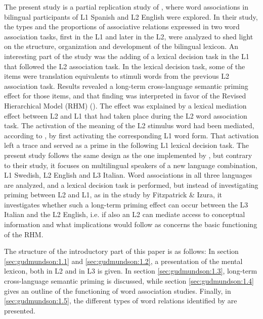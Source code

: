 \documentclass[output=paper,colorlinks,citecolor=brown,nonflat]{langsci/langscibook}
\begin{document}
The present study is a partial replication study of \citet{FitzpatrickIzura2011}, where word associations in bilingual participants of L1 Spanish and L2 English were explored. In their study, the types and the proportions of associative relations expressed in two word association tasks, first in the L1 and later in the L2, were analyzed to shed light on the structure, organization and development of the bilingual lexicon. An interesting part of the \citeauthor{FitzpatrickIzura2011} study was the adding of a lexical decision task in the L1 that followed the L2 association task. In the lexical decision task, some of the items were translation equivalents to stimuli words from the previous L2 association task. Results revealed a long-term cross-language semantic priming effect for those items, and that finding was interpreted in favor of the Revised Hierarchical Model (RHM) (\citealt{KrollStewart1994}). The effect was explained by a lexical mediation effect between L2 and L1 that had taken place during the L2 word association task. The activation of the meaning of the L2 stimulus word had been mediated, according to \citeauthor{FitzpatrickIzura2011}, by first activating the corresponding L1 word form. That activation left a trace and served as a prime in the following L1 lexical decision task. The present study follows the same design as the one implemented by \citet{FitzpatrickIzura2011}, but contrary to their study, it focuses on multilingual speakers of a new language combination, L1 Swedish, L2 English and L3 Italian. Word associations in all three languages are analyzed, and a lexical decision task is performed, but instead of investigating priming between L2 and L1, as in the study by Fitzpatrick \& Izura, it investigates whether such a long-term priming effect can occur between the L3 Italian and the L2 English, i.e. if also an L2 can mediate access to conceptual information and what implications would follow as concerns the basic functioning of the RHM.

The structure of the introductory part of this paper is as follows: In section \ref{sec:gudmundson:1.1} and \ref{sec:gudmundson:1.2}, a presentation of the mental lexicon, both in L2 and in L3 is given. In section \ref{sec:gudmundson:1.3}, long-term cross-language semantic priming is discussed, while section \ref{sec:gudmundson:1.4} gives an outline of the functioning of word association studies. Finally, in \ref{sec:gudmundson:1.5}, the different types of word relations identified by \citet{FitzpatrickIzura2011} are presented.
\end{document}
